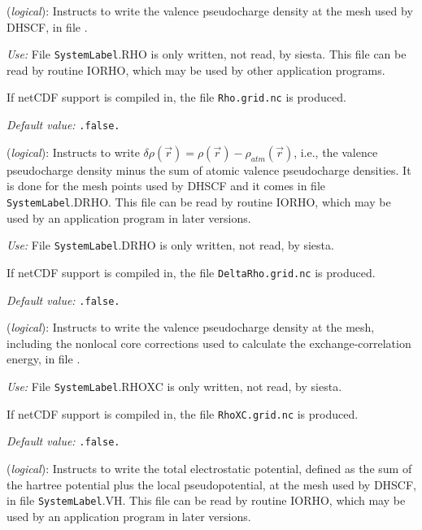 \begin{description}
\itemsep 10pt
\parsep 0pt

\item[\textbf{SaveRho}] (\textit{logical}):  Instructs to write the
  valence pseudocharge density at the mesh used by DHSCF, in file .

\textit{Use:} File \texttt{SystemLabel}.RHO is only written, not read, by siesta.
This file can be read by routine IORHO, which may be used by other
application programs.

If netCDF support is compiled in, the file \texttt{Rho.grid.nc} is produced.

\textit{Default value:} \texttt{.false.}


\item[\textbf{SaveDeltaRho}] (\textit{logical}):
Instructs to write $\delta \rho(\vec r) = \rho(\vec r) - \rho_{atm}(\vec r)$,
i.e., the valence pseudocharge density minus the sum of atomic valence
pseudocharge densities. It is done for the mesh points used by DHSCF and it
comes in file \texttt{SystemLabel}.DRHO. This file can be read by routine IORHO,
which may be used by an application program in later versions.

\textit{Use:} File \texttt{SystemLabel}.DRHO is only written, not read, by siesta.

If netCDF support is compiled in, the file \texttt{DeltaRho.grid.nc} is produced.

\textit{Default value:} \texttt{.false.}


\item[\textbf{SaveRhoXC}] (\textit{logical}):  Instructs to write the
  valence pseudocharge density at the mesh, including the nonlocal
core corrections used to calculate the exchange-correlation energy, 
in file .

\textit{Use:} File \texttt{SystemLabel}.RHOXC is only written, not read, by siesta.

If netCDF support is compiled in, the file \texttt{RhoXC.grid.nc} is produced.

\textit{Default value:} \texttt{.false.}


\item[\textbf{SaveElectrostaticPotential}] (\textit{logical}):
Instructs to write the total electrostatic potential, defined as the
sum of the hartree potential plus the local pseudopotential, at the
mesh used by DHSCF,
in file \texttt{SystemLabel}.VH. This file can be read by routine IORHO,
which may be used by an application program in later versions.


\end{description}
